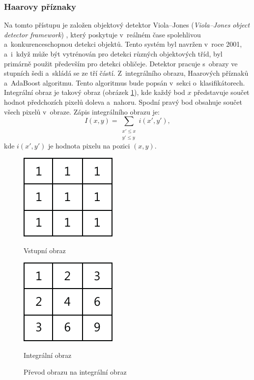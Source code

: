 \subsubsection*{Haarovy příznaky}
Na tomto přístupu je založen objektový detektor Viola--Jones (\textit{Viola--Jones object detector framework}) \cite{violajones}, který poskytuje v~reálném čase spolehlivou a~konkurenceschopnou detekci objektů. Tento systém byl navržen v~roce 2001, a~i~když může být vytrénován pro detekci různých objektových tříd, byl primárně použit především pro detekci obličeje. Detektor pracuje s~obrazy ve stupních šedi a~skládá se ze tří částí. Z~integrálního obrazu, Haarových příznaků a~AdaBoost\cite{adaboost} algoritmu. Tento algoritmus bude popsán v~sekci o~klasifikátorech. 
Integrální obraz je takový obraz (obrázek \ref{fig:integralimage}), kde každý bod $x$ představuje součet hodnot předchozích pixelů doleva a~nahoru. Spodní pravý bod obsahuje součet všech pixelů v~obraze.
Zápis integrálního obrazu je:
\begin{equation*}
\label{integralimage}
 I(x, y) = \sum_{\substack{x' \leq x \\ y' \leq y}}{} i(x', y'),
\end{equation*}
kde $i(x', y')$ je hodnota pixelu na pozici $(x, y)$.
\begin{figure}[H]
\centering
\begin{minipage}{.4\textwidth}
  \centering
  \includegraphics[width=.5\linewidth]{figures/ii_input}
  \caption*{Vstupní obraz}
  \label{fig:ii_input}
\end{minipage}%
\begin{minipage}{.4\textwidth}
  \centering
  \includegraphics[width=.5\linewidth]{figures/ii_output}
  \caption*{Integrální obraz}
  \label{fig:ii_output}
\end{minipage}
\caption{Převod obrazu na integrální obraz}
\label{fig:integralimage}
\end{figure}


